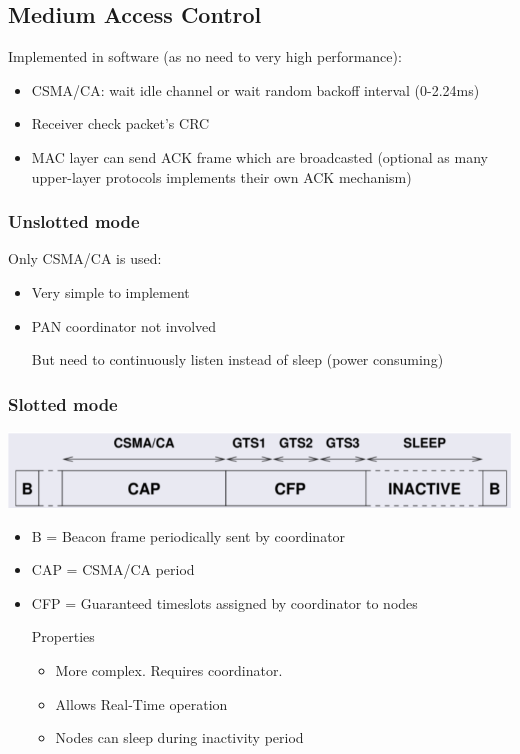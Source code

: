 \subsection{Medium Access Control}
Implemented in software (as no need to very high performance):
\begin{itemize}
    \item CSMA/CA: wait idle channel or wait random backoff interval
        (0-2.24ms)
    \item Receiver check packet's CRC
    \item MAC layer can send ACK frame which are broadcasted
        (optional as many upper-layer protocols implements their
        own ACK mechanism)
\end{itemize}

\subsubsection{Unslotted mode}
Only CSMA/CA is used:
\begin{itemize}
    \item Very simple to implement 
    \item PAN coordinator not involved
    \item[But] need to continuously listen instead of sleep
        (power consuming)
\end{itemize}

\subsubsection{Slotted mode}

\begin{center}
    \includegraphics[width=0.5\linewidth]{img/slotted.png}
\end{center}

\begin{itemize}
    \item B = Beacon frame periodically sent by coordinator
    \item CAP = CSMA/CA period
    \item CFP = Guaranteed timeslots assigned by coordinator to nodes
    \item[Properties] 
        \begin{itemize}
            \item More complex. Requires coordinator.
            \item Allows Real-Time operation
            \item Nodes can sleep during inactivity period
        \end{itemize}
\end{itemize}

